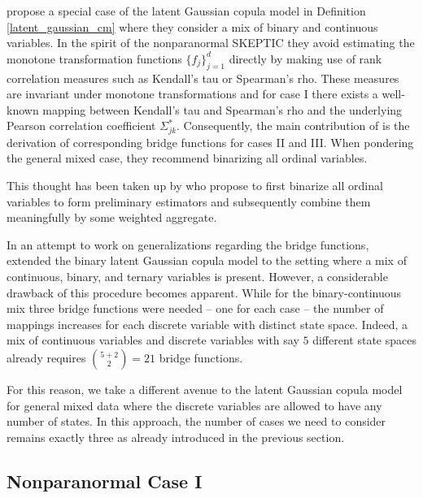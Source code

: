 
\citet{Fan17} propose a special case of the latent Gaussian copula model in Definition \ref{latent_gaussian_cm} where they consider a mix of binary and continuous variables. In the spirit of the nonparanormal SKEPTIC \citep{Liu12} they avoid estimating the monotone transformation functions $\{f_j\}_{j=1}^d$ directly by making use of rank correlation measures such as Kendall's tau or Spearman's rho. These measures are invariant under monotone transformations and for case I there exists a well-known mapping between Kendall's tau and Spearman's rho and the underlying Pearson correlation coefficient $\Sigma_{jk}^*$. Consequently, the main contribution of \citet{Fan17} is the derivation of corresponding bridge functions for cases II and III. When pondering the general mixed case, they recommend binarizing all ordinal variables.

This thought has been taken up by \citet{Feng19} who propose to first binarize all ordinal variables to form preliminary estimators and subsequently combine them meaningfully by some weighted aggregate.  
 
In an attempt to work on generalizations regarding the bridge functions, \citet{Quan18} extended the binary latent Gaussian copula model to the setting where a mix of continuous, binary, and ternary variables is present. However, a considerable drawback of this procedure becomes apparent. While for the binary-continuous mix three bridge functions were needed -- one for each case -- the number of mappings increases for each discrete variable with distinct state space. Indeed, a mix of continuous variables and discrete variables with say $5$ different state spaces already requires $\binom{5+2}{2} = 21$ bridge functions.   
 
For this reason, we take a different avenue to the latent Gaussian copula model for general mixed data where the discrete variables are allowed to have any number of states. In this approach, the number of cases we need to consider remains exactly three as already introduced in the previous section. 

\subsection{Nonparanormal Case I}\label{sec::nonparanormal_case1} 

